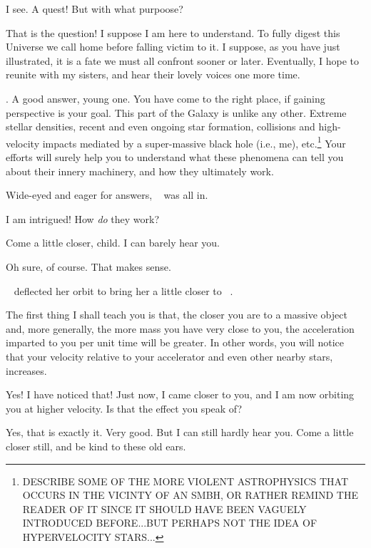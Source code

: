 \documentclass[main.tex]{subfiles}
\begin{document}
\newpara \Chiron I see.  A quest!  But with what purpoose?

\newpara \Electra That is the question!  I suppose I am here to understand.  To fully digest this Universe we call home before falling victim to it.  I suppose, as you have just illustrated, it is a fate we must all confront sooner or later.  Eventually, I hope to reunite with my sisters, and hear their lovely voices one more time.

\newpara \Chiron.  A good answer, young one.  You have come to the right place, if gaining perspective is your goal.  This part of the Galaxy is unlike any other.  Extreme stellar densities, recent and even ongoing star formation, collisions and high-velocity impacts mediated by a super-massive black hole (i.e., me), etc.\footnote{DESCRIBE SOME OF THE MORE VIOLENT ASTROPHYSICS THAT OCCURS IN THE VICINTY OF AN SMBH, OR RATHER REMIND THE READER OF IT SINCE IT SHOULD HAVE BEEN VAGUELY INTRODUCED BEFORE...BUT PERHAPS NOT THE IDEA OF HYPERVELOCITY STARS...}  Your efforts will surely help you to understand what these phenomena can tell you about their innery machinery, and how they ultimately work.

\newpara \nar Wide-eyed and eager for answers, \rmelectra~ was all in.

\newpara \Electra I am intrigued!  How \textit{do} they work?

\newpara \Chiron Come a little closer, child.  I can barely hear you.

\newpara \Electra Oh sure, of course.  That makes sense.

\newpara \nar \rmelectra~ deflected her orbit to bring her a little closer to \rmchiron~.

\newpara \Chiron The first thing I shall teach you is that, the closer you are to a massive object and, more generally, the more mass you have very close to you, the acceleration imparted to you per unit time will be greater.  In other words, you will notice that your velocity relative to your accelerator and even other nearby stars, increases.

\newpara \Electra Yes!  I have noticed that!  Just now, I came closer to you, and I am now orbiting you at higher velocity.  Is that the effect you speak of?

\newpara \Chiron Yes, that is exactly it.  Very good.  But I can still hardly hear you.  Come a little closer still, and be kind to these old ears.
\end{document}
